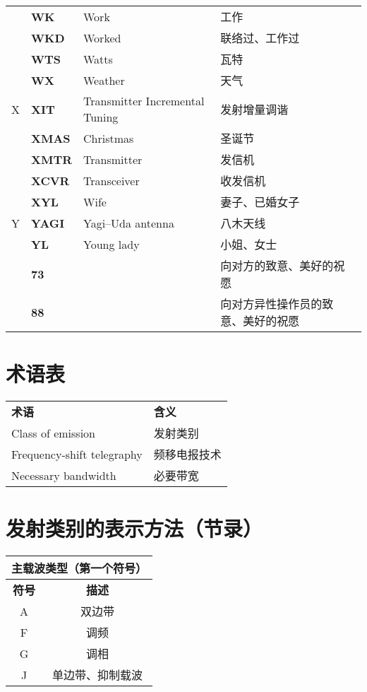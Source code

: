 \begin{longtable}[l]{llll}
& \textbf{WK} & Work & 工作 \\
& \textbf{WKD} & Worked & 联络过、工作过 \\
& \textbf{WTS} & Watts & 瓦特 \\
& \textbf{WX} & Weather & 天气 \\
X & \textbf{XIT} & Transmitter Incremental Tuning & 发射增量调谐 \\
& \textbf{XMAS} & Christmas & 圣诞节 \\
& \textbf{XMTR} & Transmitter & 发信机 \\
& \textbf{XCVR} & Transceiver & 收发信机 \\
& \textbf{XYL} & Wife & 妻子、已婚女子 \\
Y & \textbf{YAGI} & Yagi–Uda antenna & 八木天线 \\
& \textbf{YL} & Young lady & 小姐、女士 \\
& \textbf{73} & & 向对方的致意、美好的祝愿 \\
& \textbf{88} & & 向对方异性操作员的致意、美好的祝愿 \\
\end{longtable}

\newpage



\section{术语表}

\begin{longtable}[l]{ll}
	\textbf{术语} & \textbf{含义} \\
	Class of emission & 发射类别 \\
	Frequency-shift telegraphy & 频移电报技术\\
	Necessary bandwidth & 必要带宽 \\
\end{longtable}

\newpage



\section{发射类别的表示方法（节录）}

\begin{tabular}{|c|c|}
	\hline
	\multicolumn{2}{|c|}{\textbf{主载波类型（第一个符号）}} \\
	\hline
	\textbf{符号} & \textbf{描述} \\
	\hline
	A & 双边带 \\
	\hline
	F & 调频 \\
	\hline
	G & 调相 \\
	\hline
	J & 单边带、抑制载波 \\
	\hline
\end{tabular}

